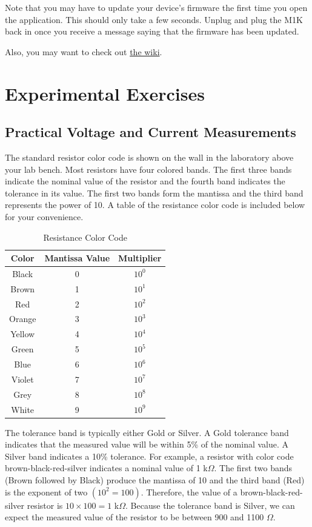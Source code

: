 \documentclass[12pt]{../manual}
\begin{document}
Note that you may have to update your device's firmware the first time you open the application. This should only take a few seconds. Unplug and plug the M1K back in once you receive a message saying that the firmware has been updated.

Also, you may want to check out \href{https://wiki.analog.com/university/tools/m1k/pixelpulse}{the wiki}.

\newpage
\section{Experimental Exercises}
\subsection{Practical Voltage and Current Measurements}
The standard resistor color code is shown on the wall in the laboratory above your lab bench. Most resistors have four colored bands. The first three bands indicate the nominal value of the resistor and the fourth band indicates the tolerance in its value. The first two bands form the mantissa and the third band represents the power of 10. A table of the resistance color code is included below for your convenience.

\def\arraystretch{1.4}
\begin{table}[ht!]
\caption{Resistance Color Code}
\centering
\begin{tabular}{|c|c|c|} \hline
Color 	& Mantissa Value & Multiplier \\ \hline \hline
Black 	& 0 & $10^0$ \\ \hline
Brown 	& 1 & $10^1$ \\ \hline
Red 	& 2 & $10^2$ \\ \hline
Orange 	& 3 & $10^3$ \\ \hline
Yellow	& 4 & $10^4$ \\ \hline
Green	& 5 & $10^5$ \\ \hline
Blue	& 6 & $10^6$ \\ \hline
Violet	& 7 & $10^7$ \\ \hline
Grey	& 8 & $10^8$ \\ \hline
White	& 9 & $10^9$ \\ \hline
\end{tabular}
\end{table}

The tolerance band is typically either Gold or Silver. A Gold tolerance band indicates that the measured value will be within 5\% of the nominal value. A Silver band indicates a 10\% tolerance. For example, a resistor with color code brown-black-red-silver indicates a nominal value of 1 k$\Omega$. The first two bands (Brown followed by Black) produce the mantissa of 10 and the third band (Red) is the exponent of two $(10^2 = 100)$. Therefore, the value of a brown-black-red-silver resistor is $10 \times 100 = 1$ k$\Omega$. Because the tolerance band is Silver, we can expect the measured value of the resistor to be between 900 and 1100 $\Omega$. 
\end{document}
